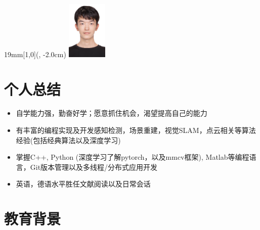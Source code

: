 \documentclass{resume}
\begin{document}


 
\newcommand{\UniversitaetLogoBreite}{19mm}
\newcommand{\SeitenrandOben}{1cm}
\begin{textblock*}{\UniversitaetLogoBreite}[1,0](\textwidth-10mm, -2.0cm)%
	\raggedleft\includegraphics[width=0.75in]{我的照片.jpg}%
\end{textblock*}
 
\section{个人总结}
\begin{itemize}
\item {自学能力强，勤奋好学；愿意抓住机会，渴望提高自己的能力}
\item {有丰富的编程实现及开发感知检测，场景重建，视觉SLAM，点云相关等算法经验(包括经典算法以及深度学习)}
\item {掌握C++, Python (深度学习了解pytorch，以及mmcv框架), Matlab等编程语言，Git版本管理以及多线程/分布式应用开发}
\item {英语，德语水平胜任文献阅读以及日常会话}
\end{itemize}

\section{教育背景}
\end{document}
